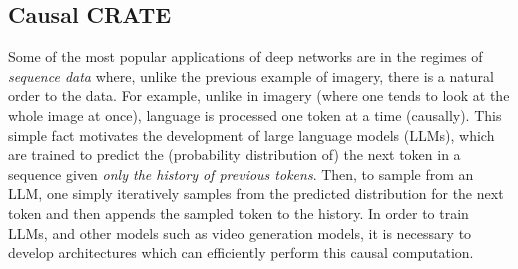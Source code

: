 \documentclass[../../book-main.tex]{subfiles}
\begin{document}
\begin{table}
    \centering
    \caption{\small\textbf{Long-context performance of
        ToST.} We demonstrate performance on the Long Range Arena, a
        benchmark of long-context (large-\(n\)) tasks. On this benchmark,
        ToST has outright superior performance and efficiency compared to
    every Transformer variant, including the Transformer itself.}
    \label{tab:tost_lra}
\end{table}

\subsection{Causal CRATE}
\label{sec:causal-crate}
Some of the most popular applications of deep networks are in the
regimes of \textit{sequence data} where, unlike the previous example
of imagery, there is a natural order to the data. For example, unlike
in imagery (where one tends to look at the whole image at once),
language is processed one token at a time (causally). This simple
fact motivates the development of large language models (LLMs), which
are trained to predict the (probability distribution of) the next
token in a sequence given \textit{only the history of previous
tokens}. Then, to sample from an LLM, one simply iteratively samples
from the predicted distribution for the next token and then appends
the sampled token to the history. In order to train LLMs, and other
models such as video generation models, it is necessary to develop
architectures which can efficiently perform this causal computation.
\end{document}
